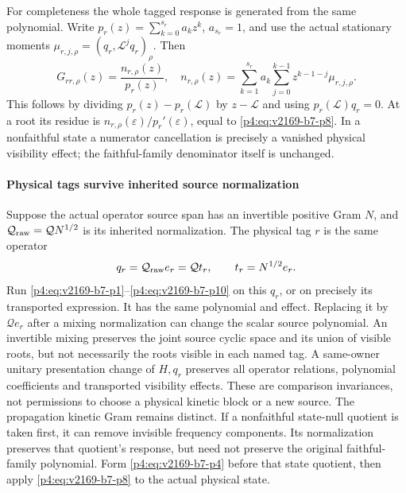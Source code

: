 \documentclass[12pt,a4paper]{article}
\begin{document}
For completeness the whole tagged response is generated from the same
polynomial. Write $p_r(z)=\sum_{k=0}^{s_r}a_kz^k$, $a_{s_r}=1$, and use the
actual stationary moments $\mu_{r,j,\rho}=(q_r,\mathcal L^jq_r)_\rho$. Then
\begin{equation}
 G_{rr,\rho}(z)=\frac{n_{r,\rho}(z)}{p_r(z)},\quad
 n_{r,\rho}(z)=\sum_{k=1}^{s_r}a_k
                 \sum_{j=0}^{k-1}z^{k-1-j}\mu_{r,j,\rho}.
 \label{p4:eq:v2169-b7-p10}
\end{equation}
This follows by dividing $p_r(z)-p_r(\mathcal L)$ by $z-\mathcal L$ and
using $p_r(\mathcal L)q_r=0$. At a root its residue is
$n_{r,\rho}(\varepsilon)/p_r'(\varepsilon)$, equal to \eqref{p4:eq:v2169-b7-p8}. In a nonfaithful
state a numerator cancellation is precisely a vanished physical visibility
effect; the faithful-family denominator itself is unchanged.



\paragraph{Physical tags survive inherited source normalization}
Suppose the actual operator source span has an invertible positive Gram $N$, and
$\mathcal Q_{\rm raw}=\mathcal Q N^{1/2}$ is its inherited normalization.
The physical tag $r$ is the same operator
\[
 q_r=\mathcal Q_{\rm raw}e_r=\mathcal Q t_r,\qquad t_r=N^{1/2}e_r.
\]
Run \eqref{p4:eq:v2169-b7-p1}--\eqref{p4:eq:v2169-b7-p10} on this $q_r$, or on precisely its transported expression.
It has the same polynomial and effect. Replacing it by $\mathcal Q e_r$
after a mixing normalization can change the scalar source polynomial.
An invertible mixing preserves the joint source cyclic space and its union
of visible roots, but not necessarily the roots visible in each named tag.
A same-owner unitary presentation change of $H,q_r$ preserves all operator
relations, polynomial coefficients and transported visibility effects.
These are comparison invariances, not permissions to choose a physical
kinetic block or a new source. The propagation kinetic Gram remains distinct.
If a nonfaithful state-null quotient is taken first, it can remove invisible
frequency components. Its normalization preserves that quotient's response,
but need not preserve the original faithful-family polynomial. Form \eqref{p4:eq:v2169-b7-p4}
before that state quotient, then apply \eqref{p4:eq:v2169-b7-p8} to the actual physical state.

\end{document}
